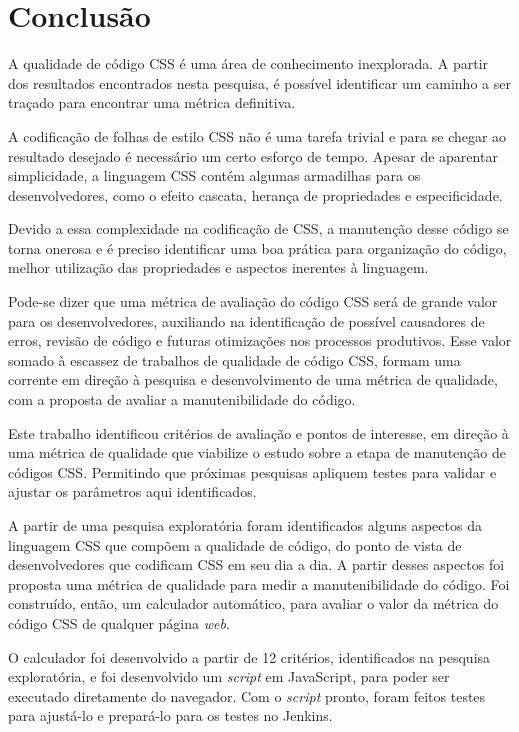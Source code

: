%
%

\chapter{Conclusão}

A qualidade de código CSS é uma área de conhecimento inexplorada. A partir dos resultados encontrados nesta pesquisa, é possível identificar um caminho a ser traçado para encontrar uma métrica definitiva.

A codificação de folhas de estilo CSS não é uma tarefa trivial e para se chegar ao resultado desejado é necessário um certo esforço de tempo. Apesar de aparentar simplicidade, a linguagem CSS contém algumas armadilhas para os desenvolvedores, como o efeito cascata, herança de propriedades e especificidade.

Devido a essa complexidade na codificação de CSS, a manutenção desse código se torna onerosa e é preciso identificar uma boa prática para organização do código, melhor utilização das propriedades e aspectos inerentes à linguagem.

Pode-se dizer que uma métrica de avaliação do código CSS será de grande valor para os desenvolvedores, auxiliando na identificação de possível causadores de erros, revisão de código e futuras otimizações nos processos produtivos. Esse valor somado à escassez de trabalhos de qualidade de código CSS, formam uma corrente em direção à pesquisa e desenvolvimento de uma métrica de qualidade, com a proposta de avaliar a manutenibilidade do código.

Este trabalho identificou critérios de avaliação e pontos de interesse, em direção à uma métrica de qualidade que viabilize o estudo sobre a etapa de manutenção de códigos CSS. Permitindo que próximas pesquisas apliquem testes para validar e ajustar os parâmetros aqui identificados.

A partir de uma pesquisa exploratória foram identificados alguns aspectos da linguagem CSS que compõem a qualidade de código, do ponto de vista de desenvolvedores que codificam CSS em seu dia a dia. A partir desses aspectos foi proposta uma métrica de qualidade para medir a manutenibilidade do código. Foi construído, então, um calculador automático, para avaliar o valor da métrica do código CSS de qualquer página \textit{web}.

O calculador foi desenvolvido a partir de 12 critérios, identificados na pesquisa exploratória, e foi desenvolvido um \textit{script} em JavaScript, para poder ser executado diretamente do navegador. Com o \textit{script} pronto, foram feitos testes para ajustá-lo e prepará-lo para os testes no Jenkins.

